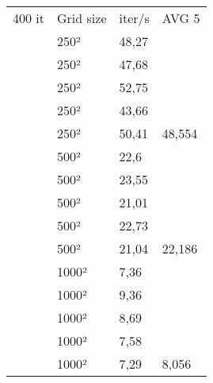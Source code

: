 \begin{center}
	\begin{table}[h]
		\centering
		\begin{tabular}{
				>{\columncolor[HTML]{C0C0C0}}l lll}
			400 it & \cellcolor[HTML]{C0C0C0}Grid size & \cellcolor[HTML]{C0C0C0}iter/s & \cellcolor[HTML]{C0C0C0}AVG 5 \\
			& 250²  & 48,27 & \cellcolor[HTML]{C0C0C0} \\
			& 250²  & 47,68 & \cellcolor[HTML]{C0C0C0} \\
			& 250²  & 52,75 & \cellcolor[HTML]{C0C0C0} \\
			& 250²  & 43,66 & \cellcolor[HTML]{C0C0C0} \\
			& 250²  & 50,41 & 48,554                   \\
			& 500²  & 22,6  & \cellcolor[HTML]{C0C0C0} \\
			& 500²  & 23,55 & \cellcolor[HTML]{C0C0C0} \\
			& 500²  & 21,01 & \cellcolor[HTML]{C0C0C0} \\
			& 500²  & 22,73 & \cellcolor[HTML]{C0C0C0} \\
			& 500²  & 21,04 & 22,186                   \\
			& 1000² & 7,36  & \cellcolor[HTML]{C0C0C0} \\
			& 1000² & 9,36  & \cellcolor[HTML]{C0C0C0} \\
			& 1000² & 8,69  & \cellcolor[HTML]{C0C0C0} \\
			& 1000² & 7,58  & \cellcolor[HTML]{C0C0C0} \\
			& 1000² & 7,29  & 8,056                   
		\end{tabular}
	\end{table}
\end{center}